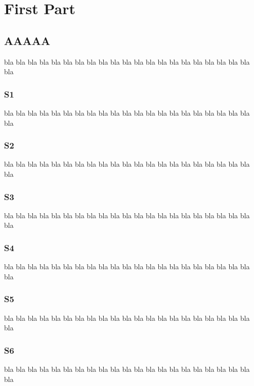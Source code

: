 \documentclass[12pt,a4paper]{report} %
\begin{document}
\dominitoc
\dominilof[c]                   %
\dominilot
\doparttoc                      %
\dopartlof                      %
\dopartlot                      %
\faketableofcontents            %
\fakelistoffigures              %
\fakelistoftables
\part{First Part}
\parttoc
\partlof[r]
\partlot[r]
\twocolumn                      %
\chapter{AAAAA}                 %
\minitoc[r]                     %
bla bla bla bla bla bla bla bla bla bla bla
bla bla bla bla bla bla bla bla bla bla bla
\section{S1}
bla bla bla bla bla bla bla bla bla bla bla
bla bla bla bla bla bla bla bla bla bla bla
\section{S2}
bla bla bla bla bla bla bla bla bla bla bla
bla bla bla bla bla bla bla bla bla bla bla
\section{S3}
bla bla bla bla bla bla bla bla bla bla bla
bla bla bla bla bla bla bla bla bla bla bla
\section{S4}
bla bla bla bla bla bla bla bla bla bla bla
bla bla bla bla bla bla bla bla bla bla bla
\section{S5}
bla bla bla bla bla bla bla bla bla bla bla
bla bla bla bla bla bla bla bla bla bla bla
\section{S6}
bla bla bla bla bla bla bla bla bla bla bla
bla bla bla bla bla bla bla bla bla bla bla
\end{document}
